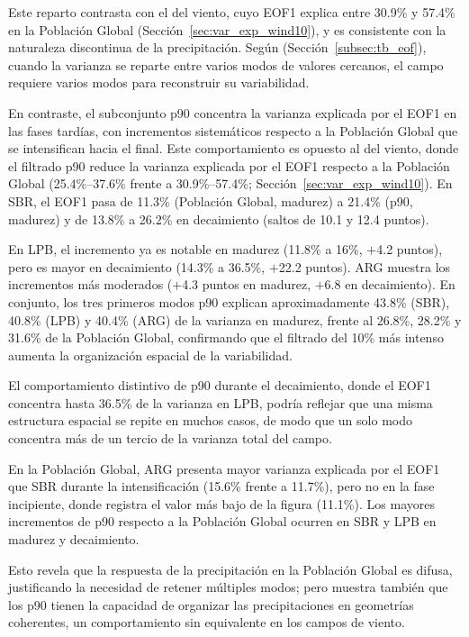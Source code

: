 Este reparto contrasta con el del viento, cuyo EOF1 explica entre 30.9\% y 57.4\% en la Población Global (Sección~\ref{sec:var_exp_wind10}), y es consistente con la naturaleza discontinua de la precipitación. Según \citet{hannachi2007empirical} (Sección~\ref{subsec:tb_eof}), cuando la varianza se reparte entre varios modos de valores cercanos, el campo requiere varios modos para reconstruir su variabilidad.

En contraste, el subconjunto p90 concentra la varianza explicada por el EOF1 en las fases tardías, con incrementos sistemáticos respecto a la Población Global que se intensifican hacia el final. Este comportamiento es opuesto al del viento, donde el filtrado p90 reduce la varianza explicada por el EOF1 respecto a la Población Global (25.4\%--37.6\% frente a 30.9\%--57.4\%; Sección~\ref{sec:var_exp_wind10}). En SBR, el EOF1 pasa de 11.3\% (Población Global, madurez) a 21.4\% (p90, madurez) y de 13.8\% a 26.2\% en decaimiento (saltos de 10.1 y 12.4 puntos).

En LPB, el incremento ya es notable en madurez (11.8\% a 16\%, $+$4.2 puntos), pero es mayor en decaimiento (14.3\% a 36.5\%, $+$22.2 puntos). ARG muestra los incrementos más moderados ($+$4.3 puntos en madurez, $+$6.8 en decaimiento). En conjunto, los tres primeros modos p90 explican aproximadamente 43.8\% (SBR), 40.8\% (LPB) y 40.4\% (ARG) de la varianza en madurez, frente al 26.8\%, 28.2\% y 31.6\% de la Población Global, confirmando que el filtrado del 10\% más intenso aumenta la organización espacial de la variabilidad.

El comportamiento distintivo de p90 durante el decaimiento, donde el EOF1 concentra hasta 36.5\% de la varianza en LPB, podría reflejar que una misma estructura espacial se repite en muchos casos, de modo que un solo modo concentra más de un tercio de la varianza total del campo.

En la Población Global, ARG presenta mayor varianza explicada por el EOF1 que SBR durante la intensificación (15.6\% frente a 11.7\%), pero no en la fase incipiente, donde registra el valor más bajo de la figura (11.1\%). Los mayores incrementos de p90 respecto a la Población Global ocurren en SBR y LPB en madurez y decaimiento.

Esto revela que la respuesta de la precipitación en la Población Global es difusa, justificando la necesidad de retener múltiples modos; pero muestra también que los p90 tienen la capacidad de organizar las precipitaciones en geometrías coherentes, un comportamiento sin equivalente en los campos de viento.

